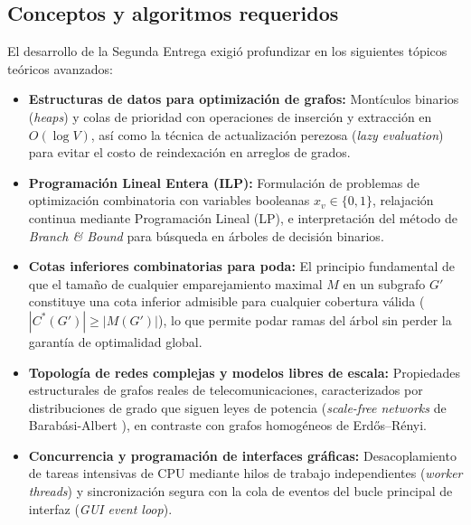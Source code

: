 \documentclass[11pt,a4paper]{article}
\begin{document}
\subsection{Conceptos y algoritmos requeridos}
El desarrollo de la Segunda Entrega exigió profundizar en los siguientes tópicos teóricos avanzados:
\begin{itemize}[itemsep=2pt]
	\item \textbf{Estructuras de datos para optimización de grafos:} Montículos binarios (\textit{heaps}) y colas de prioridad con operaciones de inserción y extracción en $O(\log V)$, así como la técnica de actualización perezosa (\textit{lazy evaluation}) para evitar el costo de reindexación en arreglos de grados.
	\item \textbf{Programación Lineal Entera (ILP):} Formulación de problemas de optimización combinatoria con variables booleanas $x_v \in \{0, 1\}$, relajación continua mediante Programación Lineal (LP), e interpretación del método de \textit{Branch \& Bound} para búsqueda en árboles de decisión binarios.
	\item \textbf{Cotas inferiores combinatorias para poda:} El principio fundamental de que el tamaño de cualquier emparejamiento maximal $M$ en un subgrafo $G'$ constituye una cota inferior admisible para cualquier cobertura válida ($|C^*(G')| \ge |M(G')|$), lo que permite podar ramas del árbol sin perder la garantía de optimalidad global.
	\item \textbf{Topología de redes complejas y modelos libres de escala:} Propiedades estructurales de grafos reales de telecomunicaciones, caracterizados por distribuciones de grado que siguen leyes de potencia (\textit{scale-free networks} de Barabási-Albert \cite{barabasi1999}), en contraste con grafos homogéneos de Erdős–Rényi.
	\item \textbf{Concurrencia y programación de interfaces gráficas:} Desacoplamiento de tareas intensivas de CPU mediante hilos de trabajo independientes (\textit{worker threads}) y sincronización segura con la cola de eventos del bucle principal de interfaz (\textit{GUI event loop}).
\end{itemize}
\end{document}
